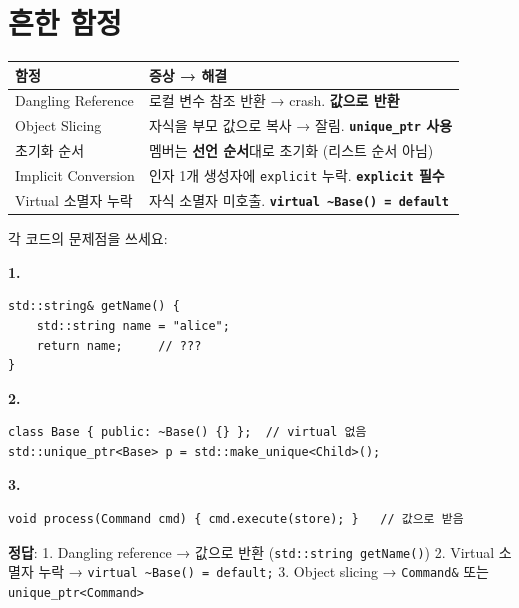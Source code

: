 \documentclass[11pt,a4paper]{article}
\newcommand{\code}[1]{\texttt{#1}}
\begin{document}
\section{흔한 함정}

\begin{warningbox}
\begin{tabularx}{\textwidth}{@{}lX@{}}
\toprule
\textbf{함정} & \textbf{증상 → 해결} \\
\midrule
Dangling Reference & 로컬 변수 참조 반환 → crash. \textbf{값으로 반환} \\
Object Slicing & 자식을 부모 값으로 복사 → 잘림. \textbf{\code{unique\_ptr} 사용} \\
초기화 순서 & 멤버는 \textbf{선언 순서}대로 초기화 (리스트 순서 아님) \\
Implicit Conversion & 인자 1개 생성자에 \code{explicit} 누락. \textbf{\code{explicit} 필수} \\
Virtual 소멸자 누락 & 자식 소멸자 미호출. \textbf{\code{virtual \~{}Base() = default}} \\
\bottomrule
\end{tabularx}
\end{warningbox}

\begin{quizbox}[title={Q: 함정 진단}]
각 코드의 문제점을 쓰세요:

\textbf{1.}
\begin{lstlisting}[style=cpp,numbers=none]
std::string& getName() {
    std::string name = "alice";
    return name;     // ???
}
\end{lstlisting}

\textbf{2.}
\begin{lstlisting}[style=cpp,numbers=none]
class Base { public: ~Base() {} };  // virtual 없음
std::unique_ptr<Base> p = std::make_unique<Child>();
\end{lstlisting}

\textbf{3.}
\begin{lstlisting}[style=cpp,numbers=none]
void process(Command cmd) { cmd.execute(store); }   // 값으로 받음
\end{lstlisting}

\textbf{정답}:
1. Dangling reference → 값으로 반환 (\code{std::string getName()})
2. Virtual 소멸자 누락 → \code{virtual \~{}Base() = default;}
3. Object slicing → \code{Command\&} 또는 \code{unique\_ptr<Command>}
\end{quizbox}
\end{document}
